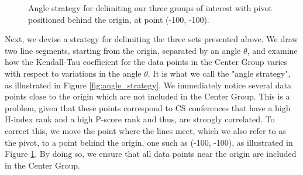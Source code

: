 \documentclass[notitlepage]{svjour3}
\begin{document}
\begin{figure}[h!]
  \begin{center}
    \caption{Angle strategy for delimiting our three groups of interest with pivot positioned behind the origin, at point (-100, -100).}
    \label{fig:angle_strategy_adapted}
  \end{center}
\end{figure}


Next, we devise a strategy for delimiting the three sets
presented above. We draw two line segments, starting from
the origin, separated by an angle $ \theta $, and examine
how the Kendall-Tau coefficient for the data points in the 
Center Group varies with respect to variations in the angle 
$ \theta $. It is what we call the "angle strategy", as 
illustrated in Figure \ref{fig:angle_strategy}. We immediately 
notice several data points close to the origin
which are not included in the Center Group. This is a problem, 
given that these points correspond to CS conferences that have a high H-index rank and a high
P-score rank and thus, are strongly correlated. To
correct this, we move the point where the lines meet, which we also
refer to as the pivot, to a point behind the origin, one
such as (-100, -100), as illustrated in Figure \ref{fig:angle_strategy_adapted}. 
By doing so, we ensure that all data points near the origin are included in the
Center Group.
\end{document}
